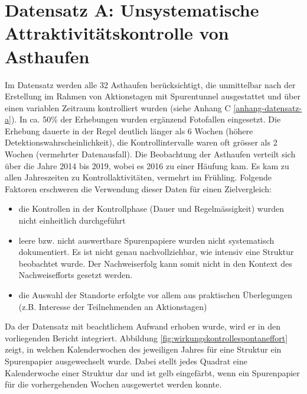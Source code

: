 \documentclass[
  oneside]{scrbook}
\providecommand{\tightlist}{%
  \setlength{\itemsep}{0pt}\setlength{\parskip}{0pt}}
\begin{document}
\hypertarget{datensatz-a-unsystematische-attraktivituxe4tskontrolle-von-asthaufen}{%
\section{Datensatz A: Unsystematische Attraktivitätskontrolle von Asthaufen}\label{datensatz-a-unsystematische-attraktivituxe4tskontrolle-von-asthaufen}}

Im Datensatz werden alle 32 Asthaufen berücksichtigt, die unmittelbar nach der Erstellung im Rahmen von Aktionstagen mit Spurentunnel ausgestattet und über einen variablen Zeitraum kontrolliert wurden (siehe Anhang C \ref{anhang-datensatz-a}). In ca. 50\% der Erhebungen wurden ergänzend Fotofallen eingesetzt. Die Erhebung dauerte in der Regel deutlich länger als 6 Wochen (höhere Detektionswahrscheinlichkeit), die Kontrollintervalle waren oft grösser als 2 Wochen (vermehrter Datenausfall). Die Beobachtung der Asthaufen verteilt sich über die Jahre 2014 bis 2019, wobei es 2016 zu einer Häufung kam. Es kam zu allen Jahreszeiten zu Kontrollaktivitäten, vermehrt im Frühling. Folgende Faktoren erschweren die Verwendung dieser Daten für einen Zielvergleich:

\begin{itemize}
\tightlist
\item
  die Kontrollen in der Kontrollphase (Dauer und Regelmässigkeit) wurden nicht einheitlich durchgeführt
\item
  leere bzw. nicht auswertbare Spurenpapiere wurden nicht systematisch dokumentiert. Es ist nicht genau nachvollziehbar, wie intensiv eine Struktur beobachtet wurde. Der Nachweiserfolg kann somit nicht in den Kontext des Nachweisefforts gesetzt werden.
\item
  die Auswahl der Standorte erfolgte vor allem aus praktischen Überlegungen (z.B. Interesse der Teilnehmenden an Aktionstagen)
\end{itemize}

Da der Datensatz mit beachtlichem Aufwand erhoben wurde, wird er in den vorliegenden Bericht integriert. Abbildung \ref{fig:wirkungskontrollespontaneffort} zeigt, in welchen Kalenderwochen des jeweiligen Jahres für eine Struktur ein Spurenpapier ausgewechselt wurde. Dabei stellt jedes Quadrat eine Kalenderwoche einer Struktur dar und ist gelb eingefärbt, wenn ein Spurenpapier für die vorhergehenden Wochen ausgewertet werden konnte.
\end{document}
